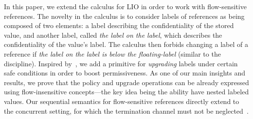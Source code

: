 In this paper, we extend the calculus for LIO in order to work with
flow-sensitive references.
The novelty in the calculus is to consider labels of references as being composed of two
elements: a label describing the confidentiality of the stored value, and
another label, called \emph{the label on the label}, which describes the
confidentiality of the value's label. The calculus then forbids changing a
label of a reference if \emph{the label on the label is below the
  floating-label} (similar to the {\nsu}
discipline).%
Inspired by~\cite{Hedin13}, we add
a primitive for \emph{upgrading} labels under certain safe conditions in
order to boost permissiveness. As one of our main insights and results, we prove
that the {\nsu} policy and upgrade operations can be already expressed using
flow-insensitive concepts---the key idea being the ability have nested labeled
values.  
Our sequential semantics for flow-sensitive references directly extend to the
concurrent setting, for which the termination channel must not be
neglected~\cite{stefan:addressing-covert}.


